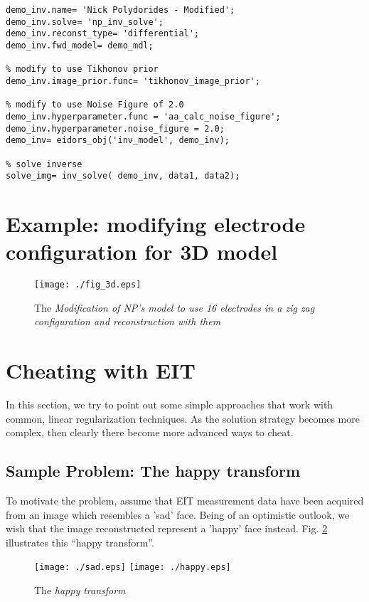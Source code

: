 \documentclass[12pt]{iopart}
\begin{document}
\begin{verbatim}
demo_inv.name= 'Nick Polydorides - Modified';
demo_inv.solve= 'np_inv_solve';
demo_inv.reconst_type= 'differential';
demo_inv.fwd_model= demo_mdl;

% modify to use Tikhonov prior
demo_inv.image_prior.func= 'tikhonov_image_prior';

% modify to use Noise Figure of 2.0
demo_inv.hyperparameter.func = 'aa_calc_noise_figure';
demo_inv.hyperparameter.noise_figure = 2.0;
demo_inv= eidors_obj('inv_model', demo_inv);

% solve inverse
solve_img= inv_solve( demo_inv, data1, data2);
\end{verbatim}

\section{
 Example: modifying electrode configuration for 3D model
}

%
%
\begin{figure}[th]
\begin{flushright}
\texttt{[image: ./fig\_3d.eps]}
\caption{\small The 
{\em Modification of NP's model to use 16 electrodes in a
zig zag configuration and reconstruction with them}
 \label{fig:fig_3d}
}
\end{flushright}
\end{figure}

\section{
 Cheating with EIT
}

In this section, we try to point out some
simple approaches that work with common, linear
regularization techniques. As the solution
strategy becomes more complex, then clearly there
become more advanced ways to cheat.

\subsection{
Sample Problem: The happy transform
}
To motivate the problem, assume that EIT measurement
data have been acquired from an image which resembles
a 'sad' face. Being of an optimistic outlook, we wish
that the image reconstructed represent a 'happy' face
instead. Fig. \ref{fig:happytransform}
illustrates this ``happy transform''.

%
%
\begin{figure}[th]
\begin{flushright}
\texttt{[image: ./sad.eps]}
\texttt{[image: ./happy.eps]}
\caption{\small The 
{\em happy transform}
 }
 \label{fig:happytransform}
\end{flushright}
\end{figure}
\end{document}
